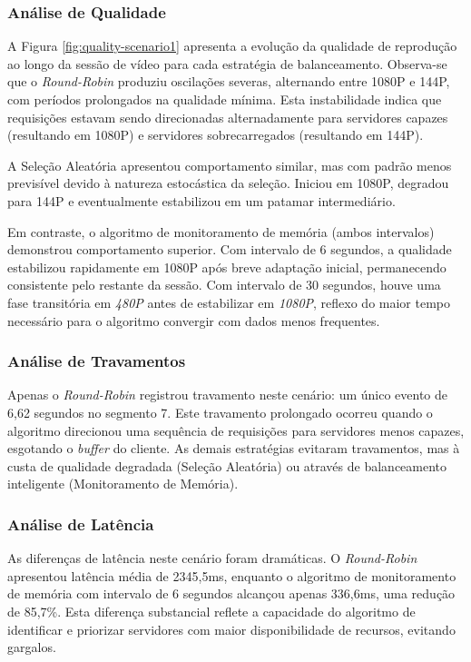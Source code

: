 \subsubsection{Análise de Qualidade}

A Figura \ref{fig:quality-scenario1} apresenta a evolução da qualidade de reprodução ao longo da sessão de vídeo para cada estratégia de balanceamento. Observa-se que o \textit{Round-Robin} produziu oscilações severas, alternando entre 1080P e 144P, com períodos prolongados na qualidade mínima. Esta instabilidade indica que requisições estavam sendo direcionadas alternadamente para servidores capazes (resultando em 1080P) e servidores sobrecarregados (resultando em 144P).

A Seleção Aleatória apresentou comportamento similar, mas com padrão menos previsível devido à natureza estocástica da seleção. Iniciou em 1080P, degradou para 144P e eventualmente estabilizou em um patamar intermediário.

Em contraste, o algoritmo de monitoramento de memória (ambos intervalos) demonstrou comportamento superior. Com intervalo de 6 segundos, a qualidade estabilizou rapidamente em 1080P após breve adaptação inicial, permanecendo consistente pelo restante da sessão. Com intervalo de 30 segundos, houve uma fase transitória em \textit{480P} antes de estabilizar em \textit{1080P}, reflexo do maior tempo necessário para o algoritmo convergir com dados menos frequentes.

\subsubsection{Análise de Travamentos}

Apenas o \textit{Round-Robin} registrou travamento neste cenário: um único evento de 6,62 segundos no segmento 7. Este travamento prolongado ocorreu quando o algoritmo direcionou uma sequência de requisições para servidores menos capazes, esgotando o \textit{buffer} do cliente. As demais estratégias evitaram travamentos, mas à custa de qualidade degradada (Seleção Aleatória) ou através de balanceamento inteligente (Monitoramento de Memória).

\subsubsection{Análise de Latência}

As diferenças de latência neste cenário foram dramáticas. O \textit{Round-Robin} apresentou latência média de 2345,5ms, enquanto o algoritmo de monitoramento de memória com intervalo de 6 segundos alcançou apenas 336,6ms, uma redução de 85,7\%. Esta diferença substancial reflete a capacidade do algoritmo de identificar e priorizar servidores com maior disponibilidade de recursos, evitando gargalos.


